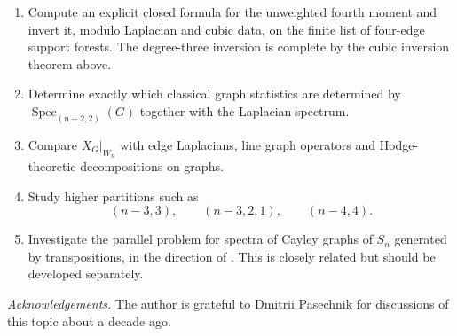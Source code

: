 \documentclass{amsart}
\theoremstyle{definition}
\newcommand{\Spec}{\operatorname{Spec}}
\begin{document}
\begin{enumerate}[label=\arabic*.]

\item Compute an explicit closed formula for the unweighted fourth moment and invert it, modulo Laplacian and cubic data, on the finite list of four-edge support forests.  The degree-three inversion is complete by the cubic inversion theorem above.

\item Determine exactly which classical graph statistics are determined by
$\Spec_{(n-2,2)}(G)$ together with the Laplacian spectrum.

\item Compare $X_G|_{W_n}$ with edge Laplacians, line graph operators and
Hodge-theoretic decompositions on graphs.

\item Study higher partitions such as
\[
(n-3,3),\qquad (n-3,2,1),\qquad (n-4,4).
\]

\item Investigate the parallel problem for spectra of Cayley graphs of
$S_n$ generated by transpositions, in the direction of
\cite{Cesi,CaputoLiggettRichthammer}.  This is closely related but should be
developed separately.

\end{enumerate}

\medskip\noindent
\emph{Acknowledgements.} The author is grateful to Dmitrii Pasechnik for discussions of this topic about a decade ago. 
\end{document}
